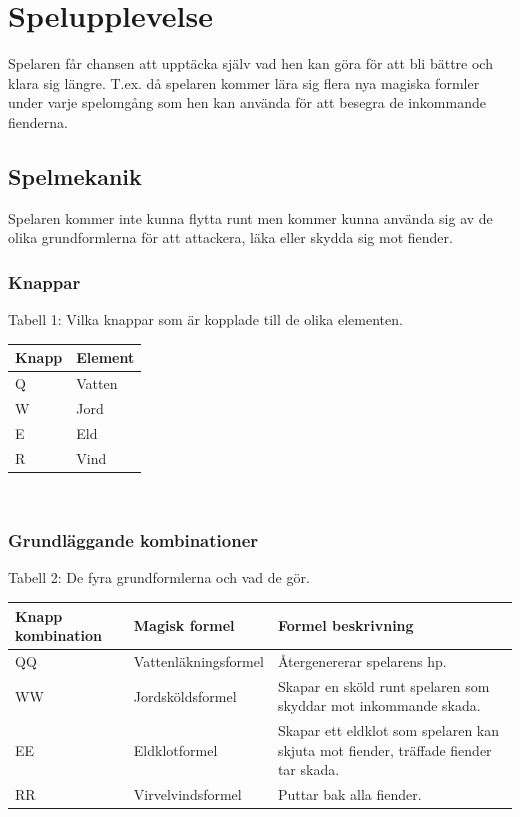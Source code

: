 \documentclass[12pt]{TDP005mall}
\begin{document}
\section{Spelupplevelse}
Spelaren får chansen att upptäcka själv vad hen kan göra för att bli bättre och klara sig längre. T.ex. då spelaren kommer lära sig flera nya magiska formler under varje spelomgång som hen kan använda för att besegra de inkommande fienderna. 

\clearpage

\subsection{Spelmekanik}
Spelaren kommer inte kunna flytta runt men kommer kunna använda sig av de olika grundformlerna för att attackera, läka eller skydda sig mot fiender.

\subsubsection{Knappar}
Tabell 1: Vilka knappar som är kopplade till de olika elementen.
\begin{table}[H]
\begin{tabular}{|l|l|}
\hline
\textbf{Knapp} & \textbf{Element} \\ \hline
Q              & Vatten           \\ \hline
W              & Jord             \\ \hline
E              & Eld              \\ \hline
R              & Vind             \\ \hline
\end{tabular}\\


\end{table}

\subsubsection{Grundläggande kombinationer}
Tabell 2: De fyra grundformlerna och vad de gör.
\begin{table}[H]
\begin{tabularx}{\linewidth}{|l|l|X|}
\hline
\textbf{Knapp kombination} & \textbf{Magisk formel} & \textbf{Formel beskrivning} \\ \hline
QQ & Vattenläkningsformel & Återgenererar spelarens hp. \\ \hline
WW & Jordsköldsformel &  Skapar en sköld runt spelaren som skyddar mot inkommande skada. \\ \hline
EE & Eldklotformel &  Skapar ett eldklot som spelaren kan skjuta mot fiender, träffade fiender tar skada. \\ \hline
RR & Virvelvindsformel & Puttar bak alla fiender. \\ \hline
\end{tabularx}\\

\end{table}
\end{document}

